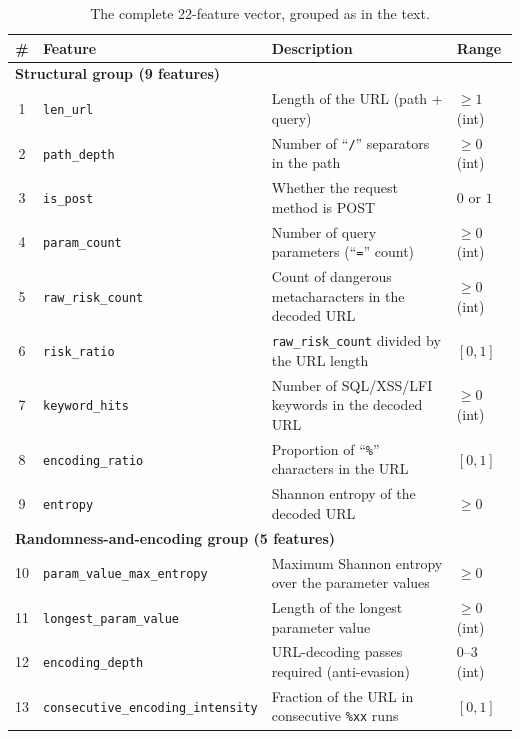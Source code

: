 \documentclass[../main.tex]{subfiles}
\begin{document}
\begin{table}[H]
  \centering
  \caption{The complete 22-feature vector, grouped as in the text.}
  \label{tab:features}
  \renewcommand{\arraystretch}{1.2}
  \setlength{\tabcolsep}{4pt}
  \footnotesize
  \begin{tabular}{|c|l|p{5.3cm}|l|}
    \hline
    \textbf{\#} & \textbf{Feature} & \textbf{Description} & \textbf{Range} \\
    \hline
    \multicolumn{4}{|l|}{\textbf{Structural group (9 features)}} \\
    \hline
    1 & \texttt{len\_url}          & Length of the URL (path + query)                      & $\geq 1$ (int) \\
    2 & \texttt{path\_depth}       & Number of ``\texttt{/}'' separators in the path       & $\geq 0$ (int) \\
    3 & \texttt{is\_post}          & Whether the request method is POST                    & $0$ or $1$ \\
    4 & \texttt{param\_count}      & Number of query parameters (``\texttt{=}'' count)     & $\geq 0$ (int) \\
    5 & \texttt{raw\_risk\_count}  & Count of dangerous metacharacters in the decoded URL  & $\geq 0$ (int) \\
    6 & \texttt{risk\_ratio}       & \texttt{raw\_risk\_count} divided by the URL length    & $[0,1]$ \\
    7 & \texttt{keyword\_hits}     & Number of SQL/XSS/LFI keywords in the decoded URL     & $\geq 0$ (int) \\
    8 & \texttt{encoding\_ratio}   & Proportion of ``\texttt{\%}'' characters in the URL    & $[0,1]$ \\
    9 & \texttt{entropy}           & Shannon entropy of the decoded URL                    & $\geq 0$ \\
    \hline
    \multicolumn{4}{|l|}{\textbf{Randomness-and-encoding group (5 features)}} \\
    \hline
    10 & \texttt{param\_value\_max\_entropy}        & Maximum Shannon entropy over the parameter values        & $\geq 0$ \\
    11 & \texttt{longest\_param\_value}             & Length of the longest parameter value                    & $\geq 0$ (int) \\
    12 & \texttt{encoding\_depth}                   & URL-decoding passes required (anti-evasion)              & $0$–$3$ (int) \\
    13 & \texttt{consecutive\_encoding\_intensity}  & Fraction of the URL in consecutive \texttt{\%xx} runs    & $[0,1]$ \\

\end{tabular}
\end{table}
\end{document}
